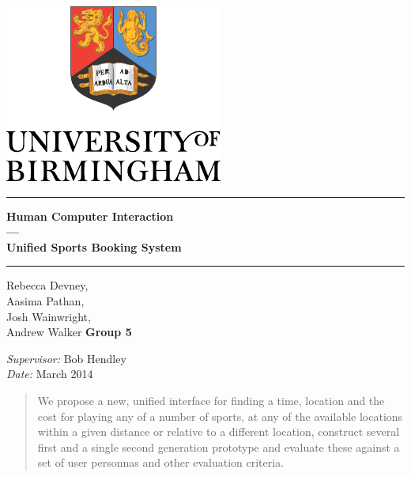 \begin{titlepage}
	\begin{center}
	\vspace*{\fill}

	\centering
	\includegraphics[scale=1.0]{Logo.pdf}
	\vfill

	\hrule
	{\LARGE\bf Human Computer Interaction \\
		--- \\
		Unified Sports Booking System\\[0.4cm]}
	\hrule

	\vfill

	\vfill
		Rebecca Devney,\\
		Aasima Pathan,\\
		Josh Wainwright,\\
		Andrew Walker
	\vfill
		\textbf{Group 5}
	\vfill

	\vfill
	\textit{Supervisor:} Bob Hendley \\
	\vfill
	\textit{Date:} March 2014
	\vfill
	\vfill

	\begin{abstract}
		We propose a new, unified interface for finding a time, location and
		the cost for playing any of a number of sports, at any of the
		available locations within a given distance or relative to a different
		location, construct several first and a single second generation
		prototype and evaluate these against a set of user personnas and other
		evaluation criteria.
	\end{abstract}

	\end{center}
\end{titlepage}


